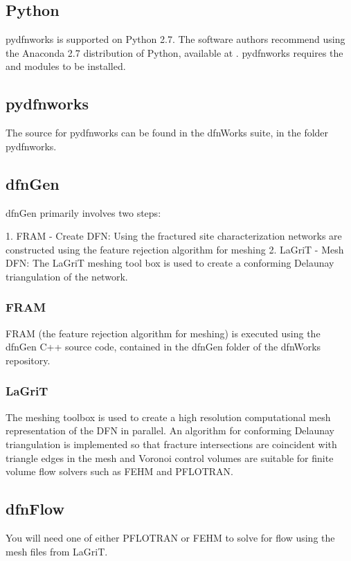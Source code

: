 \documentclass[letterpaper,10pt,english]{sphinxmanual}
\begin{document}
\subsection{Python}
\label{\detokenize{intro:python}}
pydfnworks is supported on Python 2.7. The software authors recommend using
the Anaconda 2.7 distribution of Python, available at .
pydfnworks requires the  and  modules to be installed.


\subsection{pydfnworks}
\label{\detokenize{intro:pydfnworks}}
The source for pydfnworks can be found in the dfnWorks suite, in the folder
pydfnworks.


\subsection{dfnGen}
\label{\detokenize{intro:dfngen}}
dfnGen primarily involves two steps:

1. FRAM - Create DFN: Using the fractured site characterization networks are
constructed using the feature rejection algorithm for meshing
2. LaGriT - Mesh DFN: The LaGriT meshing tool box is used to create a
conforming Delaunay triangulation of the network.


\subsubsection{FRAM}
\label{\detokenize{intro:fram}}
FRAM (the feature rejection algorithm for meshing) is executed using the
dfnGen C++ source code, contained in the dfnGen folder of the dfnWorks repository.


\subsubsection{LaGriT}
\label{\detokenize{intro:lagrit}}
The  meshing toolbox is used to create a high resolution computational
mesh representation of the DFN in parallel. An algorithm for conforming
Delaunay triangulation is implemented so that fracture intersections are
coincident with triangle edges in the mesh and Voronoi control volumes are
suitable for finite volume flow solvers such as FEHM and PFLOTRAN.


\subsection{dfnFlow}
\label{\detokenize{intro:dfnflow}}\label{\detokenize{intro:id1}}
You will need one of either PFLOTRAN or FEHM to solve for flow using the
mesh files from LaGriT.
\end{document}
